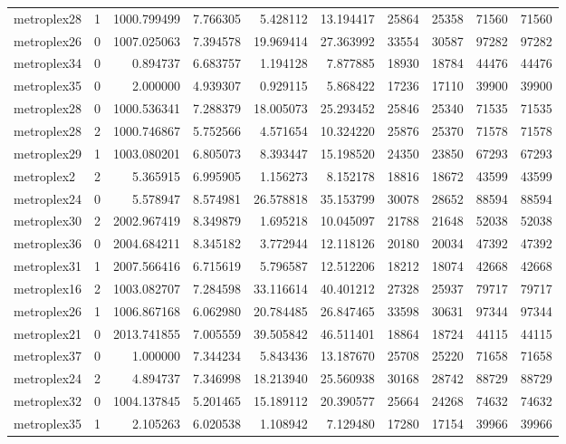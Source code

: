 \begin{longtable}{|l|r|r|r|r|r|r|r|r|r|}
metroplex28 & 1 & 1000.799499 & 7.766305 & 5.428112 & 13.194417 & 25864 & 25358 & 71560 & 71560 \\
metroplex26 & 0 & 1007.025063 & 7.394578 & 19.969414 & 27.363992 & 33554 & 30587 & 97282 & 97282 \\
metroplex34 & 0 & 0.894737 & 6.683757 & 1.194128 & 7.877885 & 18930 & 18784 & 44476 & 44476 \\
metroplex35 & 0 & 2.000000 & 4.939307 & 0.929115 & 5.868422 & 17236 & 17110 & 39900 & 39900 \\
metroplex28 & 0 & 1000.536341 & 7.288379 & 18.005073 & 25.293452 & 25846 & 25340 & 71535 & 71535 \\
metroplex28 & 2 & 1000.746867 & 5.752566 & 4.571654 & 10.324220 & 25876 & 25370 & 71578 & 71578 \\
metroplex29 & 1 & 1003.080201 & 6.805073 & 8.393447 & 15.198520 & 24350 & 23850 & 67293 & 67293 \\
metroplex2 & 2 & 5.365915 & 6.995905 & 1.156273 & 8.152178 & 18816 & 18672 & 43599 & 43599 \\
metroplex24 & 0 & 5.578947 & 8.574981 & 26.578818 & 35.153799 & 30078 & 28652 & 88594 & 88594 \\
metroplex30 & 2 & 2002.967419 & 8.349879 & 1.695218 & 10.045097 & 21788 & 21648 & 52038 & 52038 \\
metroplex36 & 0 & 2004.684211 & 8.345182 & 3.772944 & 12.118126 & 20180 & 20034 & 47392 & 47392 \\
metroplex31 & 1 & 2007.566416 & 6.715619 & 5.796587 & 12.512206 & 18212 & 18074 & 42668 & 42668 \\
metroplex16 & 2 & 1003.082707 & 7.284598 & 33.116614 & 40.401212 & 27328 & 25937 & 79717 & 79717 \\
metroplex26 & 1 & 1006.867168 & 6.062980 & 20.784485 & 26.847465 & 33598 & 30631 & 97344 & 97344 \\
metroplex21 & 0 & 2013.741855 & 7.005559 & 39.505842 & 46.511401 & 18864 & 18724 & 44115 & 44115 \\
metroplex37 & 0 & 1.000000 & 7.344234 & 5.843436 & 13.187670 & 25708 & 25220 & 71658 & 71658 \\
metroplex24 & 2 & 4.894737 & 7.346998 & 18.213940 & 25.560938 & 30168 & 28742 & 88729 & 88729 \\
metroplex32 & 0 & 1004.137845 & 5.201465 & 15.189112 & 20.390577 & 25664 & 24268 & 74632 & 74632 \\
metroplex35 & 1 & 2.105263 & 6.020538 & 1.108942 & 7.129480 & 17280 & 17154 & 39966 & 39966 \\

\end{longtable}
